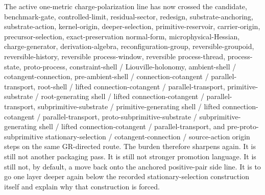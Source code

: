 \documentclass[11pt]{article}
\begin{document}
The active one-metric charge-polarization line has now crossed the candidate, benchmark-gate, controlled-limit, residual-sector, redesign, substrate-anchoring, substrate-action, kernel-origin, deeper-selection, primitive-reservoir, carrier-origin, precursor-selection, exact-preservation normal-form, microphysical-Hessian, charge-generator, derivation-algebra, reconfiguration-group, reversible-groupoid, reversible-history, reversible process-window, reversible process-thread, process-state, proto-process, constraint-shell / Liouville-holonomy, ambient-shell / cotangent-connection, pre-ambient-shell / connection-cotangent / parallel-transport, root-shell / lifted connection-cotangent / parallel-transport, primitive-substrate / root-generating shell / lifted connection-cotangent / parallel-transport, subprimitive-substrate / primitive-generating shell / lifted connection-cotangent / parallel-transport, proto-subprimitive-substrate / subprimitive-generating shell / lifted connection-cotangent / parallel-transport, and pre-proto-subprimitive stationary-selection / cotangent-connection / source-action origin steps on the same GR-directed route. The burden therefore sharpens again. It is still not another packaging pass. It is still not stronger promotion language. It is still not, by default, a move back onto the anchored positive-pair side line. It is to go one layer deeper again below the recorded stationary-selection construction itself and explain why that construction is forced.
\end{document}
